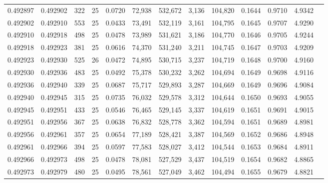 \begin{tabular}{rrrrrrrrrrrrr}
0.492897 & 0.492902 &   322 &  25 &                                     0.0720 &  72,938 & 532,672 &   3,136 & 104,820 & 0.1644 & 0.9710 & 4.9342 \\
0.492902 & 0.492910 &   553 &  25 &                                     0.0433 &  73,491 & 532,119 &   3,161 & 104,795 & 0.1645 & 0.9707 & 4.9290 \\
0.492910 & 0.492918 &   498 &  25 &                                     0.0478 &  73,989 & 531,621 &   3,186 & 104,770 & 0.1646 & 0.9705 & 4.9244 \\
0.492918 & 0.492923 &   381 &  25 &                                     0.0616 &  74,370 & 531,240 &   3,211 & 104,745 & 0.1647 & 0.9703 & 4.9209 \\
0.492923 & 0.492930 &   525 &  26 &                                     0.0472 &  74,895 & 530,715 &   3,237 & 104,719 & 0.1648 & 0.9700 & 4.9160 \\
0.492930 & 0.492936 &   483 &  25 &                                     0.0492 &  75,378 & 530,232 &   3,262 & 104,694 & 0.1649 & 0.9698 & 4.9116 \\
0.492936 & 0.492940 &   339 &  25 &                                     0.0687 &  75,717 & 529,893 &   3,287 & 104,669 & 0.1649 & 0.9696 & 4.9084 \\
0.492940 & 0.492945 &   315 &  25 &                                     0.0735 &  76,032 & 529,578 &   3,312 & 104,644 & 0.1650 & 0.9693 & 4.9055 \\
0.492945 & 0.492951 &   433 &  25 &                                     0.0546 &  76,465 & 529,145 &   3,337 & 104,619 & 0.1651 & 0.9691 & 4.9015 \\
0.492951 & 0.492956 &   367 &  25 &                                     0.0638 &  76,832 & 528,778 &   3,362 & 104,594 & 0.1651 & 0.9689 & 4.8981 \\
0.492956 & 0.492961 &   357 &  25 &                                     0.0654 &  77,189 & 528,421 &   3,387 & 104,569 & 0.1652 & 0.9686 & 4.8948 \\
0.492961 & 0.492966 &   394 &  25 &                                     0.0597 &  77,583 & 528,027 &   3,412 & 104,544 & 0.1653 & 0.9684 & 4.8911 \\
0.492966 & 0.492973 &   498 &  25 &                                     0.0478 &  78,081 & 527,529 &   3,437 & 104,519 & 0.1654 & 0.9682 & 4.8865 \\
0.492973 & 0.492979 &   480 &  25 &                                     0.0495 &  78,561 & 527,049 &   3,462 & 104,494 & 0.1655 & 0.9679 & 4.8821 \\

\end{tabular}
